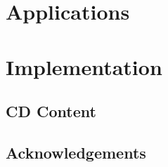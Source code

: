 \documentclass[a4paper, draft]{book}
\def\mainbibliography {
	\backmatter
	\setcounter{secnumdepth}{-1}
	
	
}
\begin{document}
\newpage

\tableofcontents
\newpage

\newpage
\mainmatter
\setcounter{secnumdepth}{-1}

\setcounter{secnumdepth}{2}
\label{part:uniformization}

%
%
%
%
%
\setcounter{part}{1}
\part{Applications}
\label{part:applications}



\part{Implementation}
\label{part:implementation}





\newpage
\mainbibliography

\backmatter
\appendix
\chapter{CD Content}
\label{chp:cd_content}

\chapter{Acknowledgements}
\end{document}
